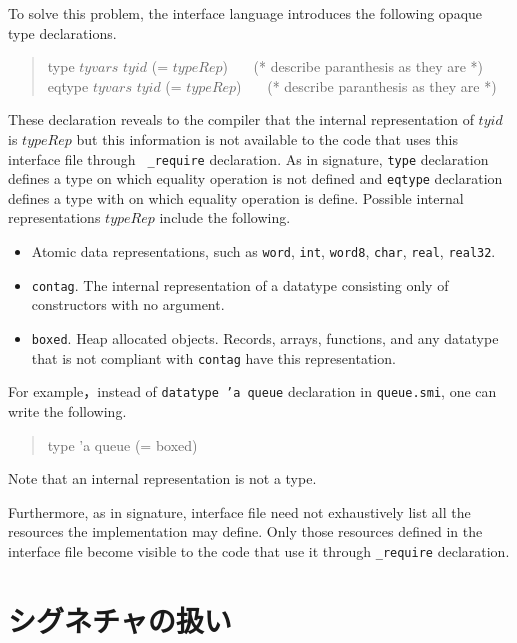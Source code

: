 \documentclass{jbook}
\newcommand{\txt}[2]{#1}
\newenvironment{program}{\begin{quote}\begin{tt}}%
                        {\end{tt}\end{quote}}
\begin{document}
	To solve this problem, the interface language introduces the
following opaque type declarations.
\begin{program}
type $tyvars$ $tyid$ (= $typeRep$) \ \ \ 
(* describe paranthesis as they are *)\\
eqtype $tyvars$ $tyid$ (= $typeRep$) \ \ \
(* describe paranthesis as they are *)
\end{program}
	These declaration reveals to the compiler that the internal
representation of $tyid$ is $typeRep$ but this information is not
available to the code that uses this interface file through {\tt
\_require} declaration.
	As in signature, {\tt type} declaration defines a type on which 
equality operation is not defined and {\tt eqtype} declaration defines a
type with on which  equality operation is define.
 	Possible internal representations $typeRep$ include the
following.
\begin{itemize}
\item Atomic data representations, such as
{\tt word}, {\tt int}, {\tt word8}, {\tt char}, {\tt real}, {\tt real32}.
\item {\tt contag}.
	The internal representation of a datatype consisting only of
constructors with no argument.
\item {\tt boxed}.
	Heap allocated objects.
	Records, arrays, functions, and any datatype that is not compliant
with {\tt contag} have this representation.
\end{itemize}
	For example，instead of {\tt datatype 'a queue} declaration in
{\tt queue.smi}, one can write the following.
\begin{program}
type 'a queue (= boxed)
\end{program}
	Note that an internal representation is not a type.

	Furthermore, as in signature, interface file need not
exhaustively list all the resources the implementation may define.
	Only those resources defined in the interface file become
visible to the code that use it through {\tt \_require} declaration.
\fi%

\section{\txt{シグネチャの扱い}{Treatment of signatures}}
\label{sec:tutorialSignatureInInterface}
\end{document}
